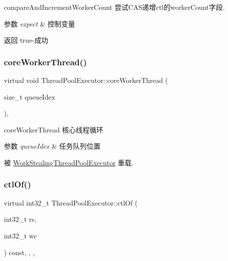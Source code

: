 compare\+And\+Increment\+Worker\+Count 尝试\+C\+A\+S递增ctl的worker\+Count字段. 


\begin{DoxyParams}{参数}
{\em expect} & 控制变量\\
\hline
\end{DoxyParams}
\begin{DoxyReturn}{返回}
true-\/成功 
\end{DoxyReturn}
\mbox{\label{classThreadPoolExecutor_a5e40839bf4191b5eab9d81227ddb62c3}} 
\subsubsection{\texorpdfstring{core\+Worker\+Thread()}{coreWorkerThread()}}
{\footnotesize\ttfamily virtual void Thread\+Pool\+Executor\+::core\+Worker\+Thread (\begin{DoxyParamCaption}\item[{size\+\_\+t}]{queue\+Idex }\end{DoxyParamCaption})\hspace{0.3cm}{\ttfamily [protected]}, {\ttfamily [virtual]}}



core\+Worker\+Thread 核心线程循环 


\begin{DoxyParams}{参数}
{\em queue\+Idex} & 任务队列位置 \\
\hline
\end{DoxyParams}


被 \hyperlink{classWorkStealingThreadPoolExecutor_a9a9ad791af26c0809a9e1864544930aa}{Work\+Stealing\+Thread\+Pool\+Executor} 重载.

\mbox{\label{classThreadPoolExecutor_a31ed7a73571c79c8dbb486f27a4df4eb}} 
\subsubsection{\texorpdfstring{ctl\+Of()}{ctlOf()}}
{\footnotesize\ttfamily virtual int32\+\_\+t Thread\+Pool\+Executor\+::ctl\+Of (\begin{DoxyParamCaption}\item[{int32\+\_\+t}]{rs,  }\item[{int32\+\_\+t}]{wc }\end{DoxyParamCaption}) const\hspace{0.3cm}{\ttfamily [inline]}, {\ttfamily [final]}, {\ttfamily [protected]}, {\ttfamily [virtual]}}



